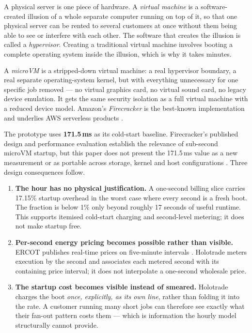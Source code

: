\documentclass[11pt,letterpaper]{article}
\newcommand{\tagbox}[3]{\tikz[baseline=(X.base)]{\node[inner xsep=3.5pt,inner ysep=1.4pt,rounded corners=1.6pt,fill=#1,text=#2,font=\bfseries\sffamily\tiny] (X) {#3};}}
\newcommand{\MODELLED}{\tagbox{amberlite}{amber!55!black}{MODELLED}}
\begin{document}
\begin{plainbox}
A physical server is one piece of hardware. A \emph{virtual machine} is a
software-created illusion of a whole separate computer running on top of it, so
that one physical server can be rented to several customers at once without
them being able to see or interfere with each other. The software that creates
the illusion is called a \emph{hypervisor}. Creating a traditional virtual
machine involves booting a complete operating system inside the illusion, which
is why it takes minutes.
\end{plainbox}

\begin{plainbox}
A \emph{microVM} is a stripped-down virtual machine: a real hypervisor
boundary, a real separate operating-system kernel, but with everything
unnecessary for one specific job removed --- no virtual graphics card, no
virtual sound card, no legacy device emulation. It gets the same security
isolation as a full virtual machine with a reduced device model. Amazon's
\emph{Firecracker} is the best-known implementation and underlies AWS
serverless products \cite{agache2020firecracker}.
\end{plainbox}

The prototype uses \textbf{171.5\,ms} as its cold-start baseline. \MODELLED{}
Firecracker's published design and performance evaluation establish the
relevance of sub-second microVM startup, but this paper does not present the
171.5\,ms value as a new measurement or as portable across storage, kernel and
host configurations \cite{agache2020firecracker}. Three design consequences
follow.

\begin{enumerate}[leftmargin=1.4em,itemsep=5pt]
\item \textbf{The hour has no physical justification.} A one-second billing
slice carries 17.15\% startup overhead in the worst case where every second is
a fresh boot. The fraction is below 1\% only beyond roughly 17 seconds of useful
runtime. This supports itemised cold-start charging and second-level metering;
it does not make startup free.

\item \textbf{Per-second energy pricing becomes possible rather than
visible.} ERCOT publishes real-time prices on five-minute intervals
\cite{ercotrtm}. Holotrade meters execution by the second and associates each
metered second with its containing price interval; it does not interpolate a
one-second wholesale price.

\item \textbf{The startup cost becomes visible instead of smeared.} Holotrade
charges the boot \emph{once, explicitly, as its own line}, rather than folding
it into the rate. A customer running many short jobs can therefore see exactly
what their fan-out pattern costs them --- which is information the hourly model
structurally cannot provide.
\end{enumerate}
\end{document}
